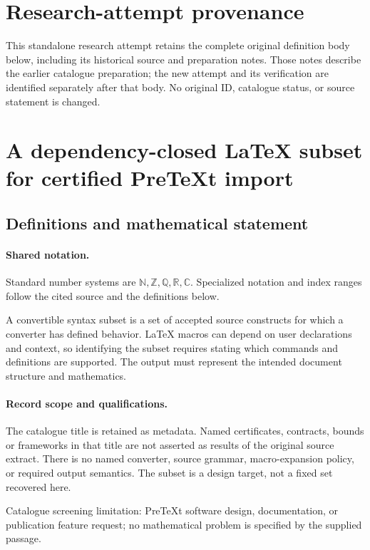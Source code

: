 \documentclass[11pt]{article}
\begin{document}
\section*{Research-attempt provenance}
This standalone research attempt retains the complete original definition body below,
including its historical source and preparation notes. Those notes describe the
earlier catalogue preparation; the new attempt and its verification are identified
separately after that body. No original ID, catalogue status, or source statement is changed.

\section{A dependency-closed LaTeX subset for certified PreTeXt import}\label{statement}

\subsection{Definitions and mathematical statement}

\paragraph{Shared notation.}Standard number systems are $\mathbb N,\mathbb Z,\mathbb Q,\mathbb R,\mathbb C$. Specialized notation and index ranges follow the cited source and the definitions below.


A convertible syntax subset is a set of accepted source constructs for which a converter has defined behavior. LaTeX macros can depend on user declarations and context, so identifying the subset requires stating which commands and definitions are supported. The output must represent the intended document structure and mathematics.
\paragraph{Record scope and qualifications.}
The catalogue title is retained as metadata. Named certificates, contracts, bounds or frameworks in that title are not asserted as results of the original source extract.
There is no named converter, source grammar, macro-expansion policy, or required output semantics. The subset is a design target, not a fixed set recovered here.

Catalogue screening limitation: PreTeXt software design, documentation, or publication feature request; no mathematical problem is specified by the supplied passage.
\end{document}
